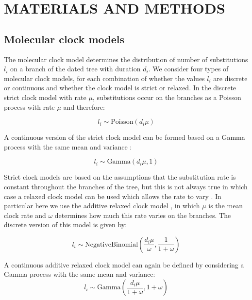 \documentclass{article}
\begin{document}
\section*{MATERIALS AND METHODS}

\subsection*{Molecular clock models}

The molecular clock model determines the distribution of number of substitutions $l_i$ on a branch of the dated
tree with duration $d_i$. We consider four types of molecular clock models, for each combination of whether
the values $l_i$ are discrete or continuous and whether the clock model is strict or relaxed. 
In the discrete strict clock
model \citep{Zuckerkandl1962} with rate $\mu$,
substitutions occur on the branches as a Poisson process with rate $\mu$ and therefore:

\begin{equation}
l_i \sim \mathrm{Poisson}(d_i \mu)
\label{eq:sc}
\end{equation}

A continuous version of the strict clock model can be formed based on a Gamma process with the same mean and variance \citep{Didelot2021}:

\begin{equation}
l_i \sim \mathrm{Gamma}(d_i \mu,1)
\label{eq:csc}
\end{equation}

Strict clock models are based on the assumptions that the substitution rate is constant throughout the branches
of the tree, but this is not always true in which case a relaxed clock model can be used which allows
the rate to vary \citep{Drummond2006}. In particular here we use the additive relaxed clock model \citep{Didelot2021},
in which $\mu$ is the mean clock rate and $\omega$ determines how much this rate varies on the branches.
The discrete version of this model is given by: 

\begin{equation}
l_i \sim \mathrm{NegativeBinomial}\left(\frac{d_i \mu}{\omega},\frac{1}{1+\omega}\right)
\label{eq:arc}
\end{equation}

A continuous additive relaxed clock model can again be defined by considering a Gamma process with the same mean and variance:
\begin{equation}
l_i \sim \mathrm{Gamma}\left(\frac{d_i \mu}{1+\omega},1+\omega\right)
\label{eq:carc}
\end{equation}
\end{document}
